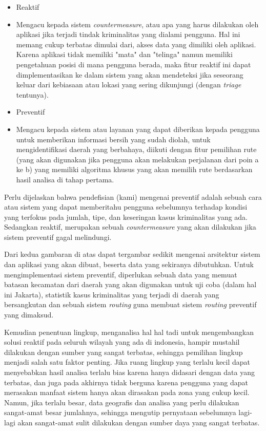 \begin{itemize}
    \item Reaktif
    \item[] Mengacu kepada sistem \textit{countermeasure}, atau apa yang harus dilakukan oleh aplikasi jika terjadi tindak kriminalitas yang dialami pengguna. Hal ini memang cukup terbatas dimulai dari, akses data yang dimiliki oleh aplikasi. Karena aplikasi tidak memiliki "mata" dan "telinga" namun memiliki pengetahuan posisi di mana pengguna berada, maka fitur reaktif ini dapat dimplementasikan ke dalam sistem yang akan mendeteksi jika seseorang keluar dari kebiasaan atau lokasi yang sering dikunjungi (dengan \textit{triage} tentunya).
    \item Preventif
    \item[] Mengacu kepada sistem atau layanan yang dapat diberikan kepada pengguna untuk memberikan informasi bersih yang sudah diolah, untuk mengidentifikasi daerah yang berbahaya, diikuti dengan fitur pemilihan rute (yang akan digunakan jika pengguna akan melakukan perjalanan dari poin a ke b) yang memiliki algoritma khusus yang akan memilih rute berdasarkan hasil analisa di tahap pertama.
\end{itemize}

Perlu dijelaskan bahwa pendefisian (kami) mengenai preventif adalah sebuah cara atau sistem yang dapat memberitahu pengguna sebelumnya terhadap kondisi yang terfokus pada jumlah, tipe, dan keseringan kasus kriminalitas yang ada. Sedangkan reaktif, merupakan sebuah \textit{countermeasure} yang akan dilakukan jika sistem preventif gagal melindungi.

Dari kedua gambaran di atas dapat tergambar sedikit mengenai arsitektur sistem dan aplikasi yang akan dibuat, beserta data yang sekiranya dibutuhkan. Untuk mengimplementasi sistem preventif, diperlukan sebuah data yang memuat batasan kecamatan dari daerah yang akan digunakan untuk uji coba (dalam hal ini Jakarta), statistik kasus kriminalitas yang terjadi di daerah yang bersangkutan dan sebuah sistem \textit{routing} guna membuat sistem \textit{routing} preventif yang dimaksud.

Kemudian penentuan lingkup, menganalisa hal hal tadi untuk mengembangkan solusi reaktif pada seluruh wilayah yang ada di indonesia, hampir mustahil dilakukan dengan sumber yang sangat terbatas, sehingga pemilihan lingkup menjadi salah satu faktor penting. Jika ruang lingkup yang terlalu kecil dapat menyebabkan hasil analisa terlalu bias karena hanya didasari dengan data yang terbatas, dan juga pada akhirnya tidak berguna karena pengguna yang dapat merasakan manfaat sistem hanya akan dirasakan pada zona yang cukup kecil. Namun, jika terlalu besar, data geografis dan analisa yang perlu dilakukan sangat-amat besar jumlahnya, sehingga mengutip pernyataan sebelumnya lagi-lagi akan sangat-amat sulit dilakukan dengan sumber daya yang sangat terbatas.

